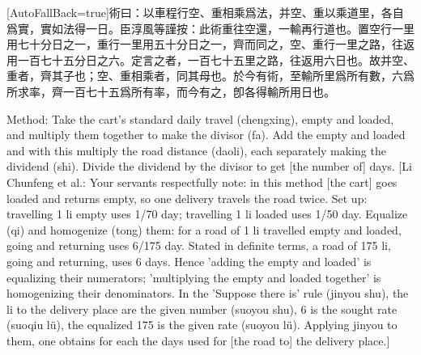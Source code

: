 \documentclass[11pt]{article}
\newcommand{\zhsmall}{\footnotesize\color{black!70}}
\newcommand{\unitlabel}[1]{\marginpar{\raggedleft\tiny\color{gray}#1}}
\newenvironment{unitzh}{\par\CJKfontspec{Noto Serif CJK SC}[AutoFallBack=true]\large\linespread{1.25}\selectfont}{\par}
\newenvironment{uniten}{\par\small\color{black!85}}{\par\medskip}
\begin{document}
\begin{unitzh}\unitlabel{jiuzhang-024.2}術曰：以車程行空、重相乘爲法，并空、重以乘道里，各自爲實，實如法得一日。{\zhsmall 臣淳風等謹按：此術重往空還，一輸再行道也。置空行一里用七十分日之一，重行一里用五十分日之一，齊而同之，空、重行一里之路，往返用一百七十五分日之六。定言之者，一百七十五里之路，往返用六日也。故并空、重者，齊其子也；空、重相乘者，同其母也。於今有術，至輸所里爲所有數，六爲所求率，齊一百七十五爲所有率，而今有之，卽各得輸所用日也。}\end{unitzh}
\begin{uniten}Method: Take the cart's standard daily travel (chengxing), empty and loaded, and multiply them together to make the divisor (fa). Add the empty and loaded and with this multiply the road distance (daoli), each separately making the dividend (shi). Divide the dividend by the divisor to get [the number of] days. [Li Chunfeng et al.: Your servants respectfully note: in this method [the cart] goes loaded and returns empty, so one delivery travels the road twice. Set up: travelling 1 li empty uses 1/70 day; travelling 1 li loaded uses 1/50 day. Equalize (qi) and homogenize (tong) them: for a road of 1 li travelled empty and loaded, going and returning uses 6/175 day. Stated in definite terms, a road of 175 li, going and returning, uses 6 days. Hence 'adding the empty and loaded' is equalizing their numerators; 'multiplying the empty and loaded together' is homogenizing their denominators. In the 'Suppose there is' rule (jinyou shu), the li to the delivery place are the given number (suoyou shu), 6 is the sought rate (suoqiu lü), the equalized 175 is the given rate (suoyou lü). Applying jinyou to them, one obtains for each the days used for [the road to] the delivery place.]\end{uniten}
\end{document}
